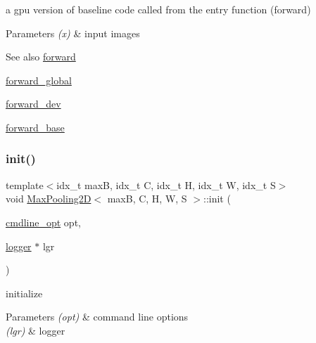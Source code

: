 a gpu version of baseline code called from the entry function (forward) 


\begin{DoxyParams}{Parameters}
{\em (x)} & input images \\
\hline
\end{DoxyParams}
\begin{DoxySeeAlso}{See also}
\hyperlink{structMaxPooling2D_ac533b4e08d8f2e708bbdc8f8e2d784a2}{forward} 

\hyperlink{softmaxcrossentropy_8h_a578aeeb166bd06e800d9b396eab48b35}{forward\+\_\+global} 

\hyperlink{structMaxPooling2D_a978800c6648a820257f2934e9970e12e}{forward\+\_\+dev} 

\hyperlink{structMaxPooling2D_adde941f72d6c91ecb63253afb845dbfa}{forward\+\_\+base} 
\end{DoxySeeAlso}
\mbox{\label{structMaxPooling2D_a004da9768f6934b82ce6758ab7da92be}} 
\subsubsection{\texorpdfstring{init()}{init()}}
{\footnotesize\ttfamily template$<$idx\+\_\+t maxB, idx\+\_\+t C, idx\+\_\+t H, idx\+\_\+t W, idx\+\_\+t S$>$ \\
void \hyperlink{structMaxPooling2D}{Max\+Pooling2D}$<$ maxB, C, H, W, S $>$\+::init (\begin{DoxyParamCaption}\item[{\hyperlink{structcmdline__opt}{cmdline\+\_\+opt}}]{opt,  }\item[{\hyperlink{structlogger}{logger} $\ast$}]{lgr }\end{DoxyParamCaption})\hspace{0.3cm}{\ttfamily [inline]}}



initialize 


\begin{DoxyParams}{Parameters}
{\em (opt)} & command line options \\
\hline
{\em (lgr)} & logger \\
\hline
\end{DoxyParams}
\mbox{\label{structMaxPooling2D_a2cb8392bfcf78dc55e7157ef3095364e}} 
